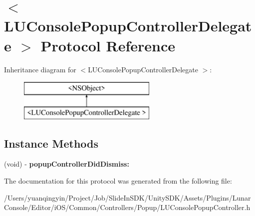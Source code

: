 \hypertarget{protocol_l_u_console_popup_controller_delegate_01-p}{}\section{$<$L\+U\+Console\+Popup\+Controller\+Delegate $>$ Protocol Reference}
\label{protocol_l_u_console_popup_controller_delegate_01-p}
Inheritance diagram for $<$L\+U\+Console\+Popup\+Controller\+Delegate $>$\+:\begin{figure}[H]
\begin{center}
\leavevmode
\includegraphics[height=2.000000cm]{protocol_l_u_console_popup_controller_delegate_01-p}
\end{center}
\end{figure}
\subsection*{Instance Methods}
\begin{DoxyCompactItemize}
\item 
\mbox{\label{protocol_l_u_console_popup_controller_delegate_01-p_aa1e9203e0e08a2d63216f45d3333d5b1}} 
(void) -\/ {\bfseries popup\+Controller\+Did\+Dismiss\+:}
\end{DoxyCompactItemize}


The documentation for this protocol was generated from the following file\+:\begin{DoxyCompactItemize}
\item 
/\+Users/yuanqingyin/\+Project/\+Job/\+Slide\+In\+S\+D\+K/\+Unity\+S\+D\+K/\+Assets/\+Plugins/\+Lunar\+Console/\+Editor/i\+O\+S/\+Common/\+Controllers/\+Popup/L\+U\+Console\+Popup\+Controller.\+h\end{DoxyCompactItemize}
